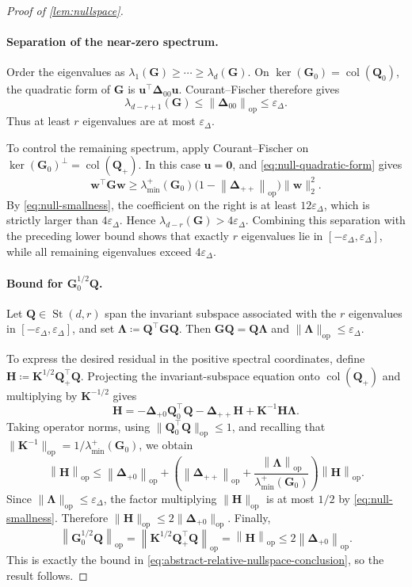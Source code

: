 \documentclass[11pt]{article}
\newcommand{\trans}{\top}
\DeclareMathOperator{\col}{col}
\DeclareMathOperator{\St}{St}
\newcommand{\opn}[1]{\left\lVert #1\right\rVert_{\mathrm{op}}}
\newcommand{\bze}{\bm{0}}
\begin{document}
\begin{proof}[Proof of \cref{lem:nullspace}]
\paragraph{Separation of the near-zero spectrum.}
Order the eigenvalues as
$\lambda_1(\bm G)\ge\cdots\ge\lambda_d(\bm G)$.
On $\ker(\bm G_0)=\col(\bm Q_0)$, the quadratic form of $\bm G$ is
$\bm u^\trans\bm\Delta_{00}\bm u$.  Courant--Fischer therefore gives
\[
  \lambda_{d-r+1}(\bm G)
  \le
  \opn{\bm\Delta_{00}}
  \le
  \varepsilon_\Delta.
\]
Thus at least $r$ eigenvalues are at most $\varepsilon_\Delta$.

To control the remaining spectrum, apply Courant--Fischer on
$\ker(\bm G_0)^\perp=\col(\bm Q_+)$.  In this case $\bm u=\bze$, and
\cref{eq:null-quadratic-form} gives
\[
  \bm w^\trans\bm G\bm w
  \ge
  \lambda_{\min}^{+}(\bm G_0)
  \bigl(
    1-\opn{\bm\Delta_{++}}
  \bigr)
  \|\bm w\|_2^2.
\]
By \cref{eq:null-smallness}, the coefficient on the right is at least
$12\varepsilon_\Delta$, which is strictly larger than
$4\varepsilon_\Delta$.  Hence
$\lambda_{d-r}(\bm G)>4\varepsilon_\Delta$.
Combining this separation with the preceding lower bound shows that exactly
$r$ eigenvalues lie in $[-\varepsilon_\Delta,\varepsilon_\Delta]$, while all remaining eigenvalues
exceed $4\varepsilon_\Delta$.

\paragraph{Bound for $\bm G_0^{1/2}\bm Q$.}
Let $\bm Q\in\St(d,r)$ span the invariant subspace associated with
the $r$ eigenvalues in $[-\varepsilon_\Delta,\varepsilon_\Delta]$, and set
$\bm\Lambda\coloneqq\bm Q^\trans\bm G\bm Q$.
Then $\bm G\bm Q=\bm Q\bm\Lambda$ and
$\|\bm\Lambda\|_{\mathrm{op}}\le \varepsilon_\Delta$.

To express the desired residual in the positive spectral coordinates, define
$\bm H\coloneqq\bm K^{1/2}\bm Q_+^\trans\bm Q$.
Projecting the invariant-subspace equation onto $\col(\bm Q_+)$ and
multiplying by $\bm K^{-1/2}$ gives
\begin{equation}
\label{eq:nullspace-H-equation}
  \bm H
  =
  -\bm\Delta_{+0}\bm Q_0^\trans\bm Q
  -\bm\Delta_{++}\bm H
  +\bm K^{-1}\bm H\bm\Lambda.
\end{equation}
Taking operator norms, using
$\|\bm Q_0^\trans\bm Q\|_{\mathrm{op}}\le1$, and recalling that
$\|\bm K^{-1}\|_{\mathrm{op}}
=1/\lambda_{\min}^{+}(\bm G_0)$, we obtain
\[
  \opn{\bm H}
  \le
  \opn{\bm\Delta_{+0}}
  +
  \left(
    \opn{\bm\Delta_{++}}
    +
    \frac{\opn{\bm\Lambda}}
         {\lambda_{\min}^{+}(\bm G_0)}
  \right)
  \opn{\bm H}.
\]
Since $\|\bm\Lambda\|_{\mathrm{op}}\le \varepsilon_\Delta$, the factor multiplying
$\|\bm H\|_{\mathrm{op}}$ is at most $1/2$ by
\cref{eq:null-smallness}.  Therefore
$\|\bm H\|_{\mathrm{op}}
\le2\|\bm\Delta_{+0}\|_{\mathrm{op}}$.
Finally,
\[
  \opn{\bm G_0^{1/2}\bm Q}
  =
  \opn{\bm K^{1/2}\bm Q_+^\trans\bm Q}
  =
  \opn{\bm H}
  \le
  2\opn{\bm\Delta_{+0}}.
\]
This is exactly the bound in
\cref{eq:abstract-relative-nullspace-conclusion}, so the result follows.
\end{proof}
 
\end{document}
